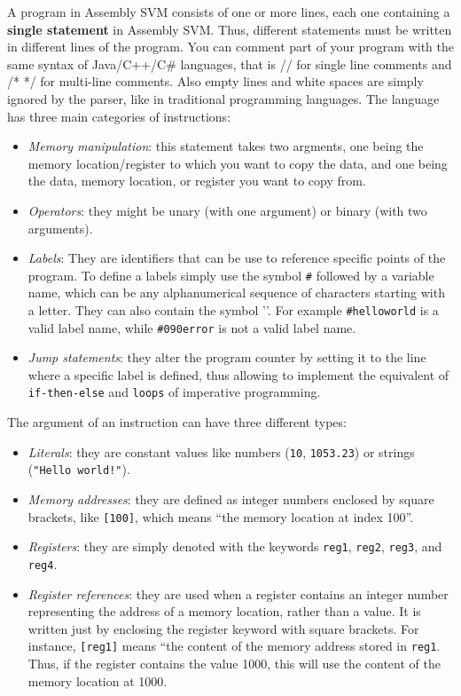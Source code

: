 A program in Assembly SVM consists of one or more lines, each one containing a \textbf{single statement} in Assembly SVM. Thus, different statements must be written in different lines of the program. You can comment part of your program with the same syntax of Java/C++/C\# languages, that is // for single line comments and /* */ for multi-line comments. Also empty lines and white spaces are simply ignored by the parser, like in traditional programming languages. The language has three main categories of instructions:

\begin{itemize}
	\item \textit{Memory manipulation}: this statement takes two argments, one being the memory location/register to which you want to copy the data, and one being the data, memory location, or register you want to copy from.
	\item \textit{Operators}: they might be unary (with one argument) or binary (with two arguments).
	\item \textit{Labels}: They are identifiers that can be use to reference specific points of the program. To define a labels simply use the symbol \texttt{\#} followed by a variable name, which can be any alphanumerical sequence of characters starting with a letter. They can also contain the symbol '\textunderscore'. For example \texttt{\#hello\textunderscore world} is a valid label name, while \texttt{\#090error} is not a valid label name.
	\item \textit{Jump statements}: they alter the program counter by setting it to the line where a specific label is defined, thus allowing to implement the equivalent of \texttt{if-then-else} and \texttt{loops} of imperative programming.
\end{itemize}

The argument of an instruction can have three different types:

\begin{itemize}
	\item \textit{Literals}: they are constant values like numbers (\texttt{10}, \texttt{1053.23}) or strings (\texttt{"Hello world!"}).
	\item \textit{Memory addresses}: they are defined as integer numbers enclosed by square brackets, like \texttt{[100]}, which means ``the memory location at index 100''.
	\item \textit{Registers}: they are simply denoted with the keywords \texttt{reg1}, \texttt{reg2}, \texttt{reg3}, and \texttt{reg4}.
	\item \textit{Register references}: they are used when a register contains an integer number representing the address of a memory location, rather than a value. It is written just by enclosing the register keyword with square brackets. For instance, \texttt{[reg1]} means ``the content of the memory address stored in \texttt{reg1}. Thus, if the register contains the value 1000, this will use the content of the memory location at 1000.
\end{itemize}